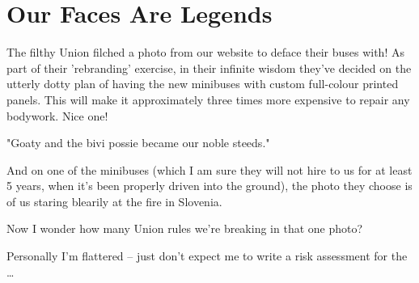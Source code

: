 \section{Our Faces Are Legends}

The filthy Union filched a photo from our website to deface their buses with! As part of their 'rebranding' exercise, in their infinite wisdom they've decided on the utterly dotty plan of having the new minibuses with
custom full-colour printed panels. This will make it approximately three times more expensive to repair any
bodywork. Nice one!

\begin{marginfigure}
      \checkoddpage \ifoddpage \forcerectofloat \else \forceversofloat \fi
      \centering
  \caption{"Goaty and the bivi possie became our noble steeds." }
\end{marginfigure}

And on one of the minibuses
(which I am sure they will not
hire to us for at least 5 years,
when it's been properly driven
into the ground), the photo
they choose is of us staring
blearily at the fire in Slovenia.

Now I wonder how many Union rules we're breaking in that one photo?

Personally I'm flattered – just
don't expect me to write a risk
assessment for the \ldots{}



